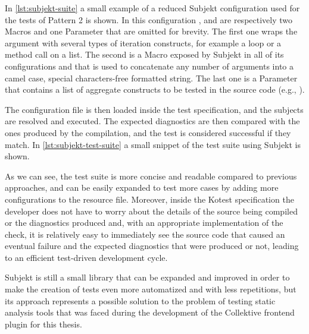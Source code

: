 \documentclass[12pt,a4paper,openright,twoside]{book}
\begin{document}
In \cref{lst:subjekt-suite} a small example of a reduced Subjekt configuration
used for the tests of Pattern 2 is shown. In this configuration ,
 and  are respectively two Macros and one
Parameter that are omitted for brevity. The first one wraps the argument with
several types of iteration constructs, for example a  loop or a
 method call on a list. The second is a Macro exposed by Subjekt in
all of its configurations and that is used to concatenate any number of
arguments into a camel case, special characters-free formatted string. The last
one is a Parameter that contains a list of aggregate constructs to be tested in
the source code (e.g., ).



The configuration file is then loaded inside the test specification, and the
subjects are resolved and executed. The expected diagnostics are then compared
with the ones produced by the compilation, and the test is considered successful
if they match. In \cref{lst:subjekt-test-suite} a small snippet of the test
suite using Subjekt is shown.



As we can see, the test suite is more concise and readable compared to previous
approaches, and can be easily expanded to test more cases by adding more
configurations to the resource file. Moreover, inside the Kotest specification
the developer does not have to worry about the details of the source being
compiled or the diagnostics produced and, with an appropriate implementation of
the check, it is relatively easy to immediately see the source code that caused
an eventual failure and the expected diagnostics that were produced or not,
leading to an efficient test-driven development cycle.

Subjekt is still a small library that can be expanded and improved in order to
make the creation of tests even more automatized and with less repetitions, but
its approach represents a possible solution to the problem of testing static
analysis tools that was faced during the development of the Collektive frontend
plugin for this thesis.
\end{document}
